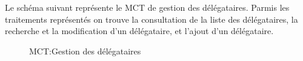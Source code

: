 \documentclass[a4paper]{report}
\begin{document}
\begin{doublespace}
	Le schéma suivant représente le MCT de gestion des délégataires. Parmis les traitements représentés
	on trouve la consultation de la liste des délégataires, la recherche et la modification d'un délégataire,
	et l'ajout d'un délégataire.
	\begin{figure}[H]
		\begin{center}
			\caption{MCT:Gestion des délégataires}
		\end{center}
	\end{figure}


\end{doublespace}
\end{document}
